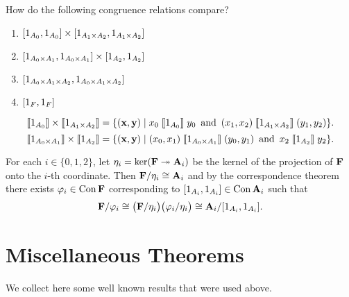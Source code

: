  How do the following congruence relations compare?
\begin{enumerate}
\item $[1_{A_0}, 1_{A_0}] \times [1_{A_1\times A_2}, 1_{A_1\times A_2}]$
\item $[1_{A_0\times A_1}, 1_{A_0\times A_1}] \times [1_{A_2}, 1_{A_2}]$
\item $[1_{A_0\times A_1\times A_2}, 1_{A_0\times A_1\times A_2}]$
\item $[1_F, 1_F]$
\end{enumerate}
\[
\llbracket 1_{A_0} \rrbracket \times \llbracket 1_{A_1\times A_2} \rrbracket = 
\{(\mathbf{x}, \mathbf{y}) \mid x_0 \mathrel{\llbracket 1_{A_0} \rrbracket} y_0 \, \text{ and } \, 
(x_1, x_2) \mathrel{\llbracket 1_{A_1\times A_2} \rrbracket} (y_1, y_2)\}.
\]
\[
\llbracket 1_{A_0\times A_1} \rrbracket \times\llbracket 1_{A_2} \rrbracket = 
\{(\mathbf{x}, \mathbf{y}) \mid  
(x_0, x_1) \mathrel{\llbracket 1_{A_0\times A_1} \rrbracket} (y_0, y_1)\, \text{ and } \, x_2 \mathrel{\llbracket 1_{A_2} \rrbracket} y_2 
\}.
\]
\bigskip

\bigskip



\renewcommand{\phi}{\ensuremath{\varphi}}
For each $i\in \{0,1,2\}$, let $\eta_i = \ker(\mathbf{F} \twoheadrightarrow \mathbf{A}_i)$ be the kernel of
the projection of $\mathbf{F}$ onto the $i$-th coordinate.  Then
$\mathbf{F}/\eta_i \cong \mathbf{A}_i$ and by the correspondence theorem there exists
$\phi_i\in \Con\bF$ corresponding to $[1_{A_i}, 1_{A_i}] \in \operatorname{Con} \mathbf{A}_i$
such that 
\[
\bF/\phi_i \cong
\bigl(\bF/\etaR_i\bigr)\bigl(\phi_i/\etaR_i\bigr)
\cong \bA_i/\com{1_{A_i}}.
\]
\newpage




\appendix

\section{Miscellaneous Theorems}
We collect here some well known results that were used above.

